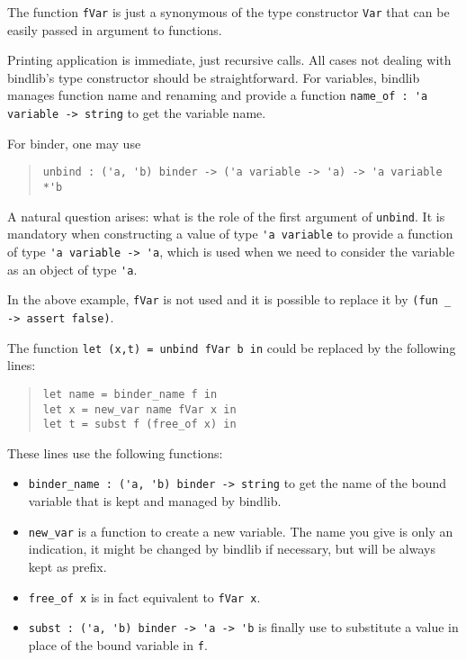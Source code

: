 \documentclass[11pt]{article}
\begin{document}
The function \verb!fVar! is just a synonymous of the type constructor
\verb!Var! that can be easily passed in argument to functions.

Printing application is immediate, just recursive calls. All cases not
dealing with bindlib's type constructor should be straightforward. For
variables, bindlib manages function name and renaming and provide a
function \verb!name_of : 'a variable -> string! to get the variable name.

For binder, one may use
\begin{quote}
\begin{verbatim}
unbind : ('a, 'b) binder -> ('a variable -> 'a) -> 'a variable *'b
\end{verbatim}
\end{quote}
A natural question arises: what is the
role of the first argument of \verb!unbind!. It is mandatory when
constructing a value of type \verb!'a variable! to provide a function
of type \verb!'a variable -> 'a!, which is used when we need to
consider the variable as an object of type \verb!'a!.

In the above example, \verb!fVar! is not used and it is possible to
replace it by \verb!(fun _ -> assert false)!.

The function \verb!let (x,t) = unbind fVar b in! could be replaced by the following lines:
\begin{quote}
\begin{verbatim}
let name = binder_name f in
let x = new_var name fVar x in
let t = subst f (free_of x) in
\end{verbatim}
\end{quote}

These lines use the following functions:

\begin{itemize}
\item \verb#binder_name : ('a, 'b) binder -> string# to get the name
  of the bound variable that is kept and managed by bindlib.

\item \verb#new_var# is a function to create a new variable.
The name you give is only an indication, it might be changed by
bindlib if necessary, but will be always kept as prefix.

\item \verb#free_of x# is in fact equivalent to \verb#fVar x#.

\item \verb#subst : ('a, 'b) binder -> 'a -> 'b# is finally use to
  substitute a value in place of the bound variable in \verb#f#.
\end{itemize}
\end{document}
